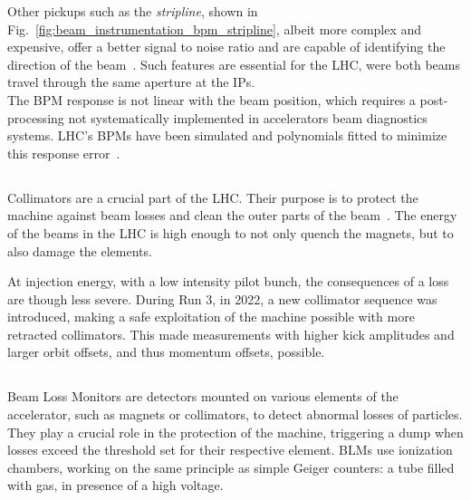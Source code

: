 Other pickups such as the \textit{stripline}, shown in
Fig.~\ref{fig:beam_instrumentation_bpm_stripline}, albeit more complex and expensive, offer a better
signal to noise ratio and are capable of identifying the direction of the
beam~\cite{wendt_bpm_2020}. Such features are essential for the LHC, were both beams travel through
the same aperture at the IPs.\\ 
The BPM response is not linear with the beam position, which requires a post-processing not
systematically implemented in accelerators beam diagnostics systems. LHC's BPMs have been simulated
and polynomials fitted to minimize this response error~\cite{a_nosych_geometrical_2014}.


 
\subsection{}

Collimators are a crucial part of the LHC. Their purpose is to protect the machine against beam
losses and clean the outer parts of the beam~\cite{redaelli_lhc_2011}. The energy of the beams in
the LHC is high enough to not only quench the magnets, but to also damage the elements.

At injection energy, with a low intensity pilot bunch, the consequences of a loss are though less
severe. During Run 3, in 2022, a new collimator sequence was introduced, making a safe exploitation
of the machine possible with more retracted collimators. This made measurements with higher kick
amplitudes and larger orbit offsets, and thus momentum offsets, possible.


\subsection{}

Beam Loss Monitors are detectors mounted on various elements of the accelerator, such as magnets or
collimators, to detect abnormal losses of particles. They play a crucial role in the protection of
the machine, triggering a dump when losses exceed the threshold set for their respective element. 
BLMs use ionization chambers, working on the same principle as simple Geiger counters: a tube filled
with gas, in presence of a high voltage.

